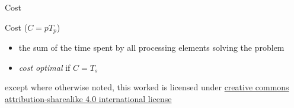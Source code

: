 \documentclass[10pt, t]{beamer}
\begin{document}
  \begin{frame}{Cost}
    \begin{block}{Cost ($C=pT_p$)}
      \begin{itemize}
        \item the sum of the time spent by all processing elements solving the
          problem
        \item \emph{cost optimal} if $C=T_s$
      \end{itemize}
    \end{block}

    \vspace{-2ex}
    \begin{center}
    \end{center}
  \end{frame}



  \appendix

  \begin{frame}[c]
    \begin{center}\ccbysa\end{center}

    except where otherwise noted, this worked is licensed under
    \href{http://creativecommons.org/licenses/by-sa/4.0/}{creative commons
    attribution-sharealike 4.0 international license}
  \end{frame}
\end{document}
